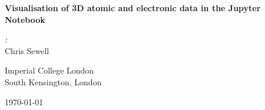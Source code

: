 \documentclass[10pt,parskip=half,
	toc=sectionentrywithdots,
	bibliography=totocnumbered,
	captions=tableheading,numbers=noendperiod]{scrartcl}
\begin{document}
		\begin{titlepage}

	\begin{center}

	\vspace*{1cm}

	\Huge\textbf{Visualisation of 3D atomic and electronic data in the Jupyter Notebook}

	\vspace{0.5cm}

	\vspace{1.5cm}

	\begin{minipage}{0.8\textwidth}   
		\begin{center}  
		\begin{minipage}{0.39\textwidth}
		\begin{flushleft} \Large
		\emph{:}\\Chris Sewell\\
		\end{flushleft}
		\end{minipage}
		\hspace{\fill}
		\begin{minipage}{0.39\textwidth}
		\begin{flushright} \Large
		\end{flushright}
		\end{minipage}
		\end{center}   
	\end{minipage}

	\vfill

	\begin{minipage}{0.8\textwidth}
	\begin{center}
	\end{center} 
	\end{minipage}

	\vspace{0.8cm}
		  \LARGE{Imperial College London}\\
		  \LARGE{South Kensington, London}\\

	\vspace{0.4cm}

	\today

	\end{center}
	\end{titlepage}

		\begingroup
    \let\cleardoublepage\relax
    \let\clearpage\relax\tableofcontents\listoffigures\listoftables
    \endgroup
\end{document}
